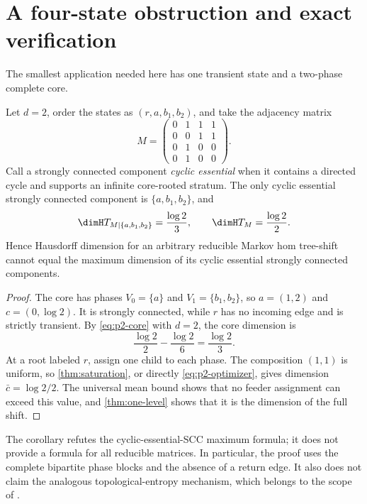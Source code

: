 \section{A four-state obstruction and exact verification}
\label{sec:example}

The smallest application needed here has one transient state and a
two-phase complete core.

\begin{corollary}
\label{cor:four-state}
Let $d=2$, order the states as $(r,a,b_1,b_2)$, and take the adjacency matrix
\begin{equation}
 M=\begin{pmatrix}
 0&1&1&1\\
 0&0&1&1\\
 0&1&0&0\\
 0&1&0&0
 \end{pmatrix}.
 \label{eq:four-state-matrix}
\end{equation}
Call a strongly connected component \emph{cyclic essential} when it contains
a directed cycle and supports an infinite core-rooted stratum.  The only
cyclic essential strongly connected component is
$\{a,b_1,b_2\}$, and
\begin{equation}
 \dimH T_{M|\{a,b_1,b_2\}}=\frac{\log2}{3},
 \qquad
 \dimH T_M=\frac{\log2}{2}.
 \label{eq:four-state-values}
\end{equation}
Hence Hausdorff dimension for an arbitrary reducible Markov hom tree-shift
cannot equal the maximum dimension of its cyclic essential strongly connected
components.
\end{corollary}

\begin{proof}
The core has phases $V_0=\{a\}$ and $V_1=\{b_1,b_2\}$, so
$a=(1,2)$ and $c=(0,\log2)$.  It is strongly connected, while $r$ has no
incoming edge and is strictly transient.  By \eqref{eq:p2-core} with $d=2$,
the core dimension is
\[
 \frac{\log2}{2}-\frac{\log2}{6}=\frac{\log2}{3}.
\]
At a root labeled $r$, assign one child to each phase.  The composition
$(1,1)$ is uniform, so \cref{thm:saturation}, or directly
\eqref{eq:p2-optimizer}, gives dimension $\bar c=\log2/2$.  The universal
mean bound shows that no feeder assignment can exceed this value, and
\cref{thm:one-level} shows that it is the dimension of the full shift.
\end{proof}

The corollary refutes the cyclic-essential-SCC maximum formula; it does not provide a
formula for all reducible matrices.  In particular, the proof uses the
complete bipartite phase blocks and the absence of a return edge.  It also
does not claim the analogous topological-entropy mechanism, which belongs to
the scope of \citet{banEtAl2021,banEtAl2022}.

